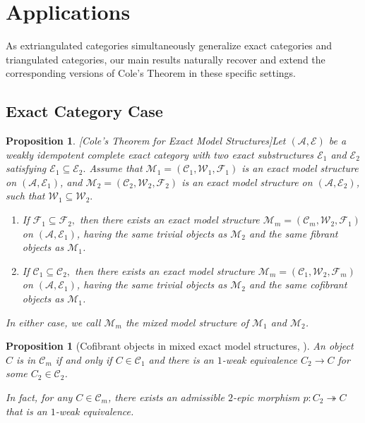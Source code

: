 \documentclass[11pt,a4paper]{amsart}
\numberwithin{equation}{section}
\theoremstyle{plain}
\newtheorem{prop}[thm]{Proposition}
\begin{document}
\section{Applications}
As extriangulated categories simultaneously generalize exact categories and triangulated categories, our main results naturally recover and extend the corresponding versions of Cole's Theorem in these specific settings.
\subsection*{Exact Category Case}
\begin{prop}\rm{\cite{Gillespie_2025}}
	[Cole's Theorem for Exact Model Structures]\label{prop:key_prop1}
	Let $(\mathcal{A},\mathcal{E})$ be a weakly idempotent complete exact category with two exact substructures $\mathcal{E}_1$ and $\mathcal{E}_2$ satisfying
	$
	\mathcal{E}_1 \subseteq \mathcal{E}_2.
	$
	Assume that
	$
	\mathcal{M}_1=(\mathcal{C}_1,\mathcal{W}_1,\mathcal{F}_1)
	$
	is an exact model structure on $(\mathcal{A},\mathcal{E}_1)$, and
	$
	\mathcal{M}_2=(\mathcal{C}_2,\mathcal{W}_2,\mathcal{F}_2)
	$
	is an exact model structure on $(\mathcal{A},\mathcal{E}_2)$, such that
	$
	\mathcal{W}_1\subseteq \mathcal{W}_2.
	$
	
	\begin{enumerate}
		\item
		If
		$
		\mathcal{F}_1\subseteq \mathcal{F}_2,
		$
		then there exists an exact model structure
		$
		\mathcal{M}_m=(\mathcal{C}_m,\mathcal{W}_2,\mathcal{F}_1)
		$
		on $(\mathcal{A},\mathcal{E}_1)$, having the same trivial objects as $\mathcal{M}_2$ and the same fibrant objects as $\mathcal{M}_1$.
		
		\item
		If
		$
		\mathcal{C}_1\subseteq \mathcal{C}_2,
		$
		then there exists an exact model structure
		$
		\mathcal{M}_m=(\mathcal{C}_1,\mathcal{W}_2,\mathcal{F}_m)
		$
		on $(\mathcal{A},\mathcal{E}_1)$, having the same trivial objects as $\mathcal{M}_2$ and the same cofibrant objects as $\mathcal{M}_1$.
	\end{enumerate}
	
	In either case, we call $\mathcal{M}_m$ the \emph{mixed model structure} of $\mathcal{M}_1$ and $\mathcal{M}_2$.
	\end{prop}
	\begin{prop}[{Cofibrant objects in mixed exact model structures, \cite{Gillespie_2025}}]
		An object $C$ is in $\mathcal{C}_m$ if and only if $C \in \mathcal{C}_1$ and there is an $1$-weak equivalence $C_2 \to C$ for some $C_2 \in \mathcal{C}_2$. 
		
		In fact, for any $C \in \mathcal{C}_m$, there exists an admissible $2$-epic morphism $p: C_2 \twoheadrightarrow C$ that is an $1$-weak equivalence.
	\end{prop}
\end{document}

